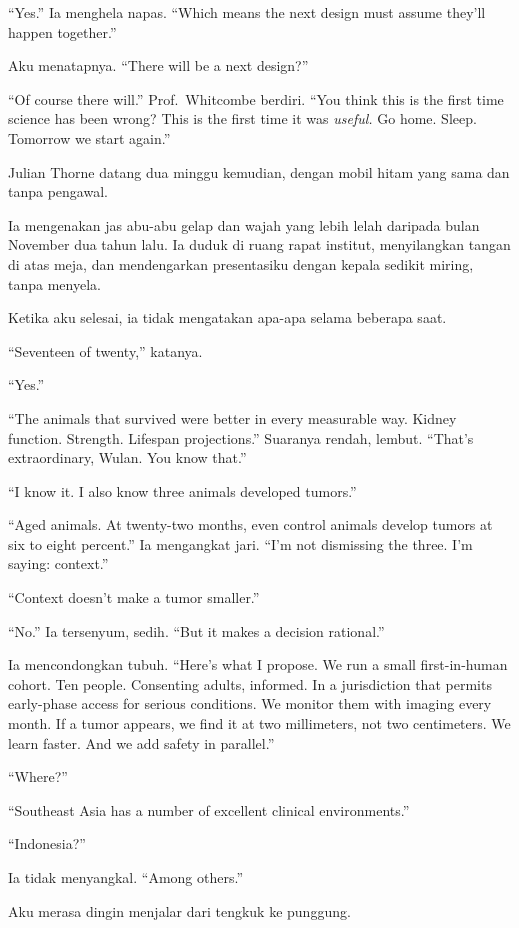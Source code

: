 \documentclass[11pt,twoside,openany]{book}
\makeatletter
\newcommand{\scenebreak}{\par\vspace{0.9em}{\centering\textsc{*\hspace{0.7em}*\hspace{0.7em}*}\par}\vspace{0.9em}\@afterindentfalse\@afterheading}
\makeatother
\begin{document}
``Yes.'' Ia menghela napas. ``Which means the next design must assume they'll happen together.''

Aku menatapnya. ``There will be a next design?''

``Of course there will.'' Prof.~Whitcombe berdiri. ``You think this is the first time science has been wrong? This is the first time it was \emph{useful.} Go home. Sleep. Tomorrow we start again.''

\scenebreak
Julian Thorne datang dua minggu kemudian, dengan mobil hitam yang sama dan tanpa pengawal.

Ia mengenakan jas abu-abu gelap dan wajah yang lebih lelah daripada bulan November dua tahun lalu. Ia duduk di ruang rapat institut, menyilangkan tangan di atas meja, dan mendengarkan presentasiku dengan kepala sedikit miring, tanpa menyela.

Ketika aku selesai, ia tidak mengatakan apa-apa selama beberapa saat.

``Seventeen of twenty,'' katanya.

``Yes.''

``The animals that survived were better in every measurable way. Kidney function. Strength. Lifespan projections.'' Suaranya rendah, lembut. ``That's extraordinary, Wulan. You know that.''

``I know it. I also know three animals developed tumors.''

``Aged animals. At twenty-two months, even control animals develop tumors at six to eight percent.'' Ia mengangkat jari. ``I'm not dismissing the three. I'm saying: context.''

``Context doesn't make a tumor smaller.''

``No.'' Ia tersenyum, sedih. ``But it makes a decision rational.''

Ia mencondongkan tubuh. ``Here's what I propose. We run a small first-in-human cohort. Ten people. Consenting adults, informed. In a jurisdiction that permits early-phase access for serious conditions. We monitor them with imaging every month. If a tumor appears, we find it at two millimeters, not two centimeters. We learn faster. And we add safety in parallel.''

``Where?''

``Southeast Asia has a number of excellent clinical environments.''

``Indonesia?''

Ia tidak menyangkal. ``Among others.''

Aku merasa dingin menjalar dari tengkuk ke punggung.
\end{document}
